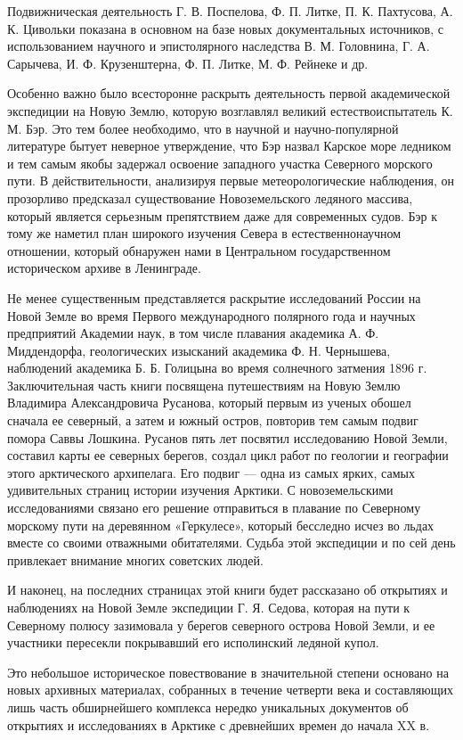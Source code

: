 \documentclass[12pt, a4paper, openany]{book}
\begin{document}
Подвижническая деятельность Г. В. Поспелова, Ф. П. Литке, П. К. Пахтусова, А. К. Цивольки показана в основном на базе новых документальных источников, с использованием научного и эпистолярного наследства В. М. Головнина, Г. А. Сарычева, И. Ф. Крузенштерна, Ф. П. Литке, М. Ф. Рейнеке и др. 

Особенно важно было всесторонне раскрыть деятельность первой академической экспедиции на Новую Землю, которую возглавлял великий естествоиспытатель К. М. Бэр. Это тем более необходимо, что в научной и научно-популярной литературе бытует неверное утверждение, что Бэр назвал Карское море ледником и тем самым якобы задержал освоение западного участка Северного морского пути. В действительности, анализируя первые метеорологические наблюдения, он прозорливо предсказал существование Новоземельского ледяного массива, который является серьезным препятствием даже для современных судов. Бэр к тому же наметил план широкого изучения Севера в естественнонаучном отношении, который обнаружен нами в Центральном государственном историческом архиве в Ленинграде. 

Не менее существенным представляется раскрытие исследований России на Новой Земле во время Первого международного полярного года и научных предприятий Академии наук, в том числе плавания академика А. Ф. Миддендорфа, геологических изысканий академика Ф. Н. Чернышева, наблюдений академика Б. Б. Голицына во время солнечного затмения 1896 г. Заключительная часть книги посвящена путешествиям на Новую Землю Владимира Александровича Русанова, который первым из ученых обошел сначала ее северный, а затем и южный остров, повторив тем самым подвиг помора Саввы Лошкина. Русанов пять лет посвятил исследованию Новой Земли, составил карты ее северных берегов, создал цикл работ по геологии и географии этого арктического архипелага. Его подвиг — одна из самых ярких, самых удивительных страниц истории изучения Арктики. С новоземельскими исследованиями связано его решение отправиться в плавание по Северному морскому пути на деревянном «Геркулесе», который бесследно исчез во льдах вместе со своими отважными обитателями. Судьба этой экспедиции и по сей день привлекает внимание многих советских людей. 

И наконец, на последних страницах этой книги будет рассказано об открытиях и наблюдениях на Новой Земле экспедиции Г. Я. Седова, которая на пути к Северному полюсу зазимовала у берегов северного острова Новой Земли, и ее участники пересекли покрывавший его исполинский ледяной купол. 

Это небольшое историческое повествование в значительной степени основано на новых архивных материалах, собранных в течение четверти века и составляющих лишь часть обширнейшего комплекса нередко уникальных документов об открытиях и исследованиях в Арктике с древнейших времен до начала XX в. 
\end{document}
